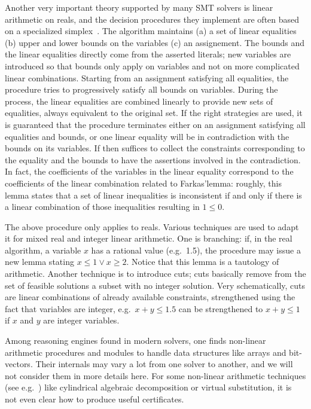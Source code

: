 \documentclass{llncs}
\begin{document}
Another very important theory supported by many SMT solvers is linear arithmetic
on reals, and the decision procedures they implement are often based on a
specialized simplex~\cite{Dutertre1}.  The algorithm maintains (a) a set of
linear equalities (b) upper and lower bounds on the variables (c) an
assignement.  The bounds and the linear equalities directly come from the
asserted literals; new variables are introduced so that bounds only apply on
variables and not on more complicated linear combinations.  Starting from an
assignment satisfying all equalities, the procedure tries to progressively
satisfy all bounds on variables.  During the process, the linear equalities are
combined linearly to provide new sets of equalities, always equivalent to the
original set.  If the right strategies are used, it is guaranteed that the
procedure terminates either on an assignment satisfying all equalities and
bounds, or one linear equality will be in contradiction with the bounds on its
variables.  If then suffices to collect the constraints corresponding to the
equality and the bounds to have the assertions involved in the contradiction.
In fact, the coefficients of the variables in the linear equality correspond to
the coefficients of the linear combination related to Farkas'lemma: roughly,
this lemma states that a set of linear inequalities is inconsistent if and only
if there is a linear combination of those inequalities resulting in $1 \leq 0$.

The above procedure only applies to reals.  Various techniques are used to adapt
it for mixed real and integer linear arithmetic.  One is branching: if, in the
real algorithm, a variable $x$ has a rational value (e.g.\ 1.5), the procedure
may issue a new lemma stating $x\leq 1 \vee x \geq 2$.  Notice that this lemma
is a tautology of arithmetic.  Another technique is to introduce cuts; cuts
basically remove from the set of feasible solutions a subset with no integer
solution.  Very schematically, cuts are linear combinations of already available
constraints, strengthened using the fact that variables are integer, e.g.\ $x+y
\leq 1.5$ can be strengthened to $x + y \leq 1$ if $x$ and $y$ are integer
variables.

Among reasoning engines found in modern solvers, one finds non-linear arithmetic
procedures and modules to handle data structures like arrays and bit-vectors.
Their internals may vary a lot from one solver to another, and we will not
consider them in more details here.  For some non-linear arithmetic techniques
(see e.g.~\cite{Bockmayr1}) like cylindrical algebraic decomposition or
virtual substitution, it is not even clear how to produce useful certificates.
\end{document}
